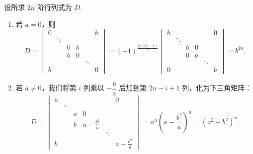 \documentclass[UTF8,12pt,a4paper,fontset=fandol]{ctexart}
\begin{document}
\begin{solve}
设所求 $2n$ 阶行列式为 $D$.
            \begin{enumerate}
                \item 若 $a=0$，则
                    \[
                        D = \begin{vmatrix}
                            0 &         &   &   &         & b \\
                              & \ddots  &   &   &         &   \\
                              &         & 0 & b &         &   \\
                              &         & b & 0 &         &   \\
                              &         &   &   & \ddots  &   \\
                            b &         &   &   &         & 0
                        \end{vmatrix}
                        = (-1)^{\frac{2n(2n-1)}{2}} \begin{vmatrix}
                            b &         &   &   &         & 0 \\
                              & \ddots  &   &   &         &   \\
                              &         & b & 0 &         &   \\
                              &         & 0 & b &         &   \\
                              &         &   &   & \ddots  &   \\
                            0 &         &   &   &         & b
                        \end{vmatrix}
                        = b^{2n}.
                    \]
                \item 若 $a \neq 0$，我们将第 $i$ 列乘以 $-\dfrac{b}{a}$ 后加到第 $2n-i+1$ 列，化为下三角矩阵：
                    \[
                        D = \begin{vmatrix}
                            a &         &   &                   &         & 0                 \\
                              & \ddots  &   &                   &         &                   \\
                              &         & a & 0                 &         &                   \\
                              &         & b & a - \frac{b^2}{a} &         &                   \\
                              &         &   &                   & \ddots  &                   \\
                            b &         &   &                   &         & a - \frac{b^2}{a}
                        \end{vmatrix}
                        = a^n (a - \frac{b^2}{a})^n
                        = (a^2 - b^2)^n.
                    \]
            \end{enumerate}
\end{solve}
\end{document}
